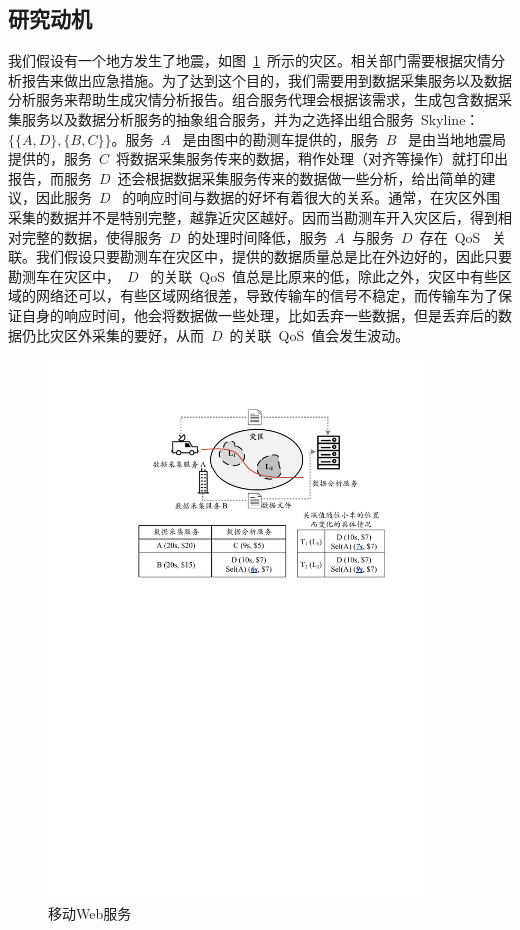 \subsection{研究动机}

我们假设有一个地方发生了地震，如图~\ref{F:Fig_MobileScene}~所示的灾区。相关部门需要根据灾情分析报告来做出应急措施。为了达到这个目的，我们需要用到数据采集服务以及数据分析服务来帮助生成灾情分析报告。组合服务代理会根据该需求，生成包含数据采集服务以及数据分析服务的抽象组合服务，并为之选择出组合服务~Skyline：$\{\{A,D\},\{B,C\}\}$。服务~$A$~ 是由图中的勘测车提供的，服务~$B$~ 是由当地地震局提供的，服务~$C$~将数据采集服务传来的数据，稍作处理（对齐等操作）就打印出报告，而服务~$D$~还会根据数据采集服务传来的数据做一些分析，给出简单的建议，因此服务~$D$~ 的响应时间与数据的好坏有着很大的关系。通常，在灾区外围采集的数据并不是特别完整，越靠近灾区越好。因而当勘测车开入灾区后，得到相对完整的数据，使得服务~$D$~的处理时间降低，服务~$A$~与服务~$D$~存在~QoS~ 关联。我们假设只要勘测车在灾区中，提供的数据质量总是比在外边好的，因此只要勘测车在灾区中，~$D$~ 的关联~QoS~值总是比原来的低，除此之外，灾区中有些区域的网络还可以，有些区域网络很差，导致传输车的信号不稳定，而传输车为了保证自身的响应时间，他会将数据做一些处理，比如丢弃一些数据，但是丢弃后的数据仍比灾区外采集的要好，从而~$D$~的关联~QoS~值会发生波动。

\begin{figure}[!thb]
    \centering
    \includegraphics[width=0.9\textwidth]{./FIGs/Fig_MobileScene.pdf}
    \caption{移动Web服务}
    \label{F:Fig_MobileScene}
\end{figure}

